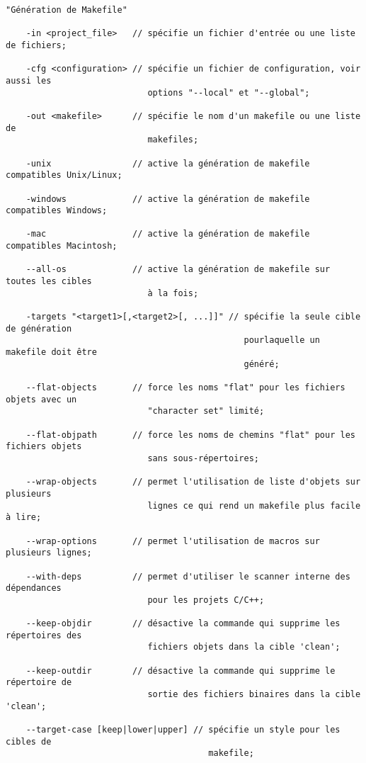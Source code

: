 \begin{verbatim}
"Génération de Makefile"

    -in <project_file>   // spécifie un fichier d'entrée ou une liste de fichiers;

    -cfg <configuration> // spécifie un fichier de configuration, voir aussi les
                            options "--local" et "--global";

    -out <makefile>      // spécifie le nom d'un makefile ou une liste de
                            makefiles;

    -unix                // active la génération de makefile compatibles Unix/Linux;

    -windows             // active la génération de makefile compatibles Windows;

    -mac                 // active la génération de makefile compatibles Macintosh;

    --all-os             // active la génération de makefile sur toutes les cibles
                            à la fois;

    -targets "<target1>[,<target2>[, ...]]" // spécifie la seule cible de génération 
                                               pourlaquelle un makefile doit être 
                                               généré;

    --flat-objects       // force les noms "flat" pour les fichiers objets avec un
                            "character set" limité;

    --flat-objpath       // force les noms de chemins "flat" pour les fichiers objets
                            sans sous-répertoires;

    --wrap-objects       // permet l'utilisation de liste d'objets sur plusieurs 
                            lignes ce qui rend un makefile plus facile à lire;

    --wrap-options       // permet l'utilisation de macros sur plusieurs lignes;

    --with-deps          // permet d'utiliser le scanner interne des dépendances 
                            pour les projets C/C++;

    --keep-objdir        // désactive la commande qui supprime les répertoires des
                            fichiers objets dans la cible 'clean';

    --keep-outdir        // désactive la commande qui supprime le répertoire de 
                            sortie des fichiers binaires dans la cible 'clean';

    --target-case [keep|lower|upper] // spécifie un style pour les cibles de 
                                        makefile;
\end{verbatim}
